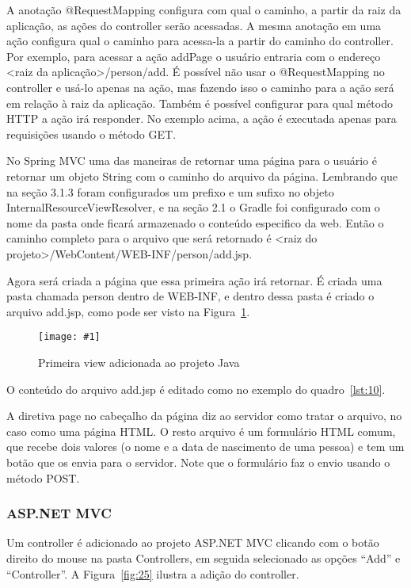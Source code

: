 \documentclass[a4paper,12pt]{article}
\newcommand{\figura}[3] {
	\begin{figure}[ht]
		\centering
		\texttt{[image: \#1]}
		\caption{#2}
		\label{#3}
	\end{figure}
	\FloatBarrier
}
\newcommand{\javacode}[3] {
	
}
\newcommand{\jspcode}[3] {
	
}
\begin{document}
\javacode{code/9.txt}{PersonController no projeto Spring}{lst:9}

A anotação @RequestMapping configura com qual o caminho, a partir da raiz da aplicação, as ações do controller serão acessadas. A mesma anotação em uma ação configura qual o caminho para acessa-la a partir do caminho do controller. Por exemplo, para acessar a ação addPage o usuário entraria com o endereço <raiz da aplicação>/person/add. É possível não usar o @RequestMapping no controller e usá-lo apenas na ação, mas fazendo isso o caminho para a ação será em relação à raiz da aplicação. Também é possível configurar para qual método HTTP a ação irá responder. No exemplo acima, a ação é executada apenas para requisições usando o método GET.

No Spring MVC uma das maneiras de retornar uma página para o usuário é retornar um objeto String com o caminho do arquivo da página. Lembrando que na seção 3.1.3 foram configurados um prefixo e um sufixo no objeto InternalResourceViewResolver, e na seção 2.1 o Gradle foi configurado com o nome da pasta onde ficará armazenado o conteúdo especifico da web. Então o caminho completo para o arquivo que será retornado é <raiz do projeto>/WebContent/WEB-INF/person/add.jsp.

Agora será criada a página que essa primeira ação irá retornar. É criada uma pasta chamada person dentro de WEB-INF, e dentro dessa pasta é criado o arquivo add.jsp, como pode ser visto na Figura~\ref{fig:24}.

\figura{24.png}{Primeira view adicionada ao projeto Java}{fig:24}

O conteúdo do arquivo add.jsp é editado como no exemplo do quadro~\ref{lst:10}.

\jspcode{code/10.txt}{Arquivo add.jsp}{lst:10}

A diretiva page no cabeçalho da página diz ao servidor como tratar o arquivo, no caso como uma página HTML. O resto arquivo é um formulário HTML comum, que recebe dois valores (o nome e a data de nascimento de uma pessoa) e tem um botão que os envia para o servidor. Note que o formulário faz o envio usando o método POST.

\subsubsection{ASP.NET MVC}

Um controller é adicionado ao projeto ASP.NET MVC clicando com o botão direito do mouse na pasta Controllers, em seguida selecionado as opções “Add” e “Controller”. A Figura~\ref{fig:25} ilustra a adição do controller.
\end{document}

